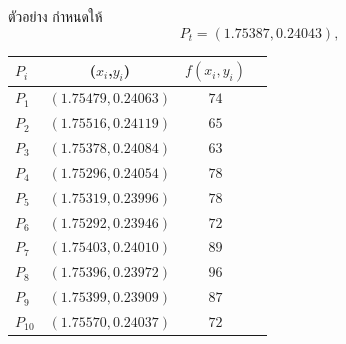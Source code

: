 \documentclass[12pt,aspectratio=169]{beamer}
\begin{document}
\begin{frame}{ตัวอย่าง}
    กำหนดให้  \[P_t = (1.75387,0.24043), \]
    \begin{center}
        \begin{tabular}{lccc} 
        \hline
       $P_i$ & ($x_i$,$y_i$) &  $f(x_i,y_i)$ \\
        \hline
        $P_1$ &$(1.75479,0.24063)$ &$74$\\
        $P_2$ &$(1.75516,0.24119)$ &$65$\\
        $P_3$ &$(1.75378,0.24084)$ &$63$\\
        $P_4$ &$(1.75296,0.24054)$ &$78$\\
        $P_5$ &$(1.75319,0.23996)$ &$78$\\
        $P_6$ &$(1.75292,0.23946)$ &$72$\\
        $P_7$ &$(1.75403,0.24010)$ &$89$\\
        $P_8$ &$(1.75396,0.23972)$ &$96$\\
        $P_9$ &$(1.75399,0.23909)$ &$87$\\
        $P_{10}$ &$(1.75570,0.24037)$ &$72$\\
        \hline
        \end{tabular}
    \end{center}
\end{frame}
\end{document}
